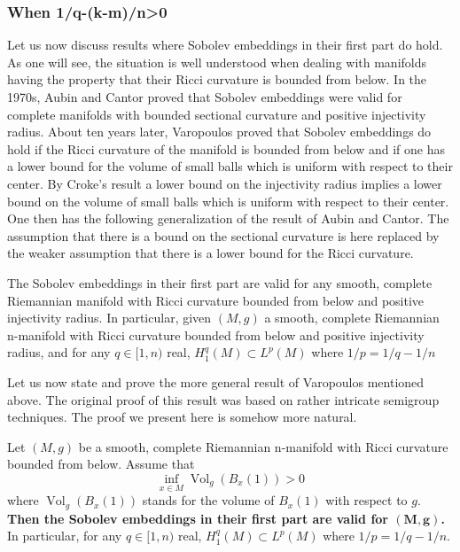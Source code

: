 \documentclass[12pt,hyperref,a4paper,UTF8]{ctexart}
\begin{document}
\subsubsection{When 1/q-(k-m)/n>0}
Let us now discuss results where Sobolev embeddings in their first part do hold. As one will see, the situation is well understood when dealing with manifolds having the property that their Ricci curvature is bounded from below. 
In the 1970s, Aubin and Cantor proved that Sobolev embeddings were valid for complete manifolds with bounded sectional curvature and positive injectivity radius. About ten years later, Varopoulos proved that Sobolev embeddings do hold if the Ricci curvature of the manifold is bounded from below and if one has a lower bound for the volume of small balls which is uniform with respect to their center. By Croke's result a lower bound on the injectivity radius implies a lower bound on the volume of small balls which is uniform with respect to their center. One then has the following generalization of the result of Aubin and Cantor. The assumption that there is a bound on the sectional curvature is here replaced by the weaker assumption that there is a lower bound for the Ricci curvature.

\begin{Proposition}
    The Sobolev embeddings in their first part are valid for any smooth, complete Riemannian manifold with Ricci curvature bounded from below and positive injectivity radius. In particular, given $(M, g)$ a smooth, complete Riemannian n-manifold with Ricci curvature bounded from below and positive injectivity radius, and for any $q \in[1, n)$ real, $H_1^q(M) \subset L^p(M)$ where $1 / p=1 / q-1 / n$
    \label{prp44}
\end{Proposition}

Let us now state and prove the more general result of Varopoulos mentioned above. The original proof of this result was based on rather intricate semigroup techniques. The proof we present here is somehow more natural. 

\begin{Theorem}
Let ${(M, g)}$ be a smooth, complete Riemannian n-manifold with Ricci curvature bounded from below. Assume that
$$
\inf_{x \in M} \operatorname{Vol}_g\left(B_x(1)\right)>0
$$
where $\operatorname{Vol}_g\left(B_x(1)\right)$ stands for the volume of ${B_x(1)}$ with respect to ${g}$. \textbf{Then the Sobolev embeddings in their first part are valid for $\bm{(M, g)}$.} In particular, for any ${q \in[1, n)}$ real, ${H_1^q(M) \subset L^p(M)}$ where ${1 / p=1 / q-1 / n}$.
\label{thm42}
\end{Theorem}
\end{document}
